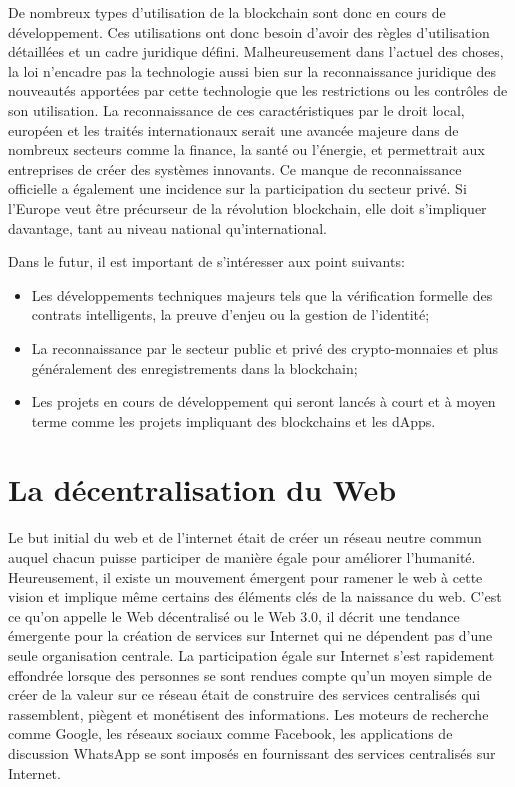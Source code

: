 \documentclass{tnreport}
\begin{document}
De nombreux types d'utilisation de la blockchain sont donc en cours de développement.
Ces utilisations ont donc besoin d'avoir des règles d'utilisation détaillées et un cadre juridique défini. Malheureusement dans l'actuel des choses, la loi n'encadre pas la technologie aussi bien sur la reconnaissance juridique des nouveautés apportées par cette technologie que les restrictions ou les contrôles de son utilisation.
La reconnaissance de ces caractéristiques par le droit local, européen et les traités internationaux serait une avancée majeure dans de nombreux secteurs comme la finance, la santé ou l'énergie, et permettrait aux entreprises de créer des systèmes innovants.
Ce manque de reconnaissance officielle a également une incidence sur la participation du secteur privé.
Si l'Europe veut être précurseur de la révolution blockchain, elle doit s'impliquer davantage, tant au niveau national qu'international.

Dans le futur, il est important de s'intéresser aux point suivants:
\begin{itemize}
	\item Les développements techniques majeurs tels que la vérification formelle des contrats intelligents, la preuve d'enjeu ou la gestion de l'identité;
	\item La reconnaissance par le secteur public et privé des crypto-monnaies et plus généralement des enregistrements dans la blockchain;
	\item Les projets en cours de développement qui seront lancés à court et à moyen terme comme les projets impliquant des blockchains et les dApps.
\end{itemize}

\section{La décentralisation du Web}

Le but initial du web et de l'internet était de créer un réseau neutre commun auquel chacun puisse participer de manière égale pour améliorer l'humanité. Heureusement, il existe un mouvement émergent pour ramener le web à cette vision et implique même certains des éléments clés de la naissance du web. C'est ce qu'on appelle le Web décentralisé ou le Web 3.0, il décrit une tendance émergente pour la création de services sur Internet qui ne dépendent pas d'une seule organisation centrale.
La participation égale sur Internet s'est rapidement effondrée lorsque des personnes se sont rendues compte qu'un moyen simple de créer de la valeur sur ce réseau était de construire des services centralisés qui rassemblent, piègent et monétisent des informations.
Les moteurs de recherche comme Google, les réseaux sociaux comme Facebook, les applications de discussion WhatsApp se sont imposés en fournissant des services centralisés sur Internet.
\end{document}
